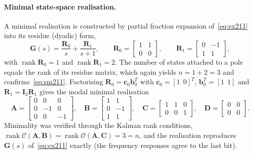 \paragraph{Minimal state-space realisation.} A minimal realisation is constructed by partial
fraction expansion of~\eqref{eq:ex211} into its residue (dyadic) form,
\begin{equation}
    \mathbf{G}(s) = \frac{\mathbf{R}_0}{s} + \frac{\mathbf{R}_1}{s+1},\qquad
    \mathbf{R}_0 = \begin{bmatrix}1&1\\0&0\end{bmatrix},\qquad
    \mathbf{R}_1 = \begin{bmatrix}0&-1\\1&1\end{bmatrix},
    \label{eq:residues211}
\end{equation}
with $\operatorname{rank}\mathbf{R}_0=1$ and $\operatorname{rank}\mathbf{R}_1=2$. The number of
states attached to a pole equals the rank of its residue matrix, which again yields
$n = 1+2 = 3$ and confirms~\eqref{eq:sm211}. Factorising
$\mathbf{R}_0=\mathbf{c}_0\mathbf{b}_0^T$ with $\mathbf{c}_0=[1\ \ 0]^T$,
$\mathbf{b}_0^T=[1\ \ 1]$ and $\mathbf{R}_1=\mathbf{I}_2\mathbf{R}_1$ gives the modal minimal
realisation
\begin{equation}
    \mathbf{A}=\begin{bmatrix}0&0&0\\0&-1&0\\0&0&-1\end{bmatrix},\quad
    \mathbf{B}=\begin{bmatrix}1&1\\0&-1\\1&1\end{bmatrix},\quad
    \mathbf{C}=\begin{bmatrix}1&1&0\\0&0&1\end{bmatrix},\quad
    \mathbf{D}=\begin{bmatrix}0&0\\0&0\end{bmatrix}.
    \label{eq:minreal211}
\end{equation}
Minimality was verified through the Kalman rank conditions,
$\operatorname{rank}\mathcal{C}(\mathbf{A},\mathbf{B})
=\operatorname{rank}\mathcal{O}(\mathbf{A},\mathbf{C})=3=n$, and the realisation reproduces
$\mathbf{G}(s)$ of~\eqref{eq:ex211} exactly (the frequency responses agree to the last bit).

